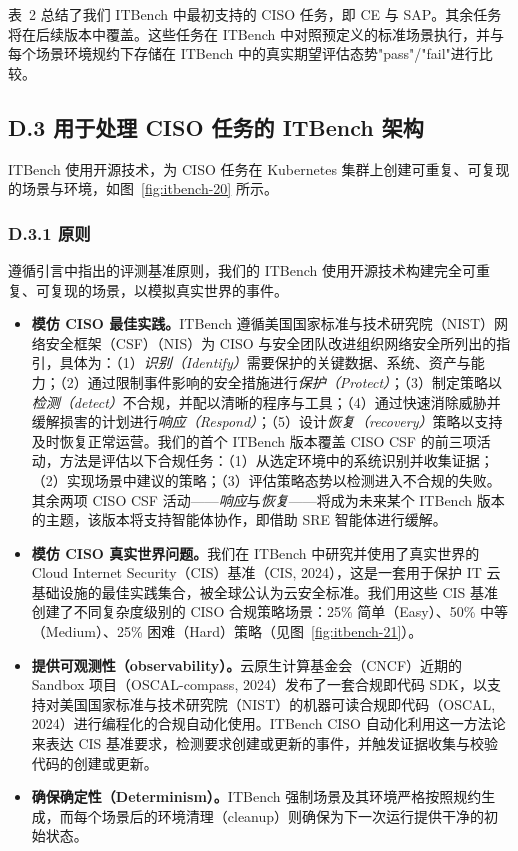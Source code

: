 \documentclass[10pt,UTF8,fontset=fandol]{ctexart}
\begin{document}
表~2 总结了我们 ITBench 中最初支持的 CISO 任务，即 CE 与 SAP。其余任务将在后续版本中覆盖。这些任务在 ITBench 中对照预定义的标准场景执行，并与每个场景环境规约下存储在 ITBench 中的真实期望评估态势"pass"/"fail"进行比较。

\subsection{D.3 用于处理 CISO 任务的 ITBench 架构}

ITBench 使用开源技术，为 CISO 任务在 Kubernetes 集群上创建可重复、可复现的场景与环境，如图~\ref{fig:itbench-20} 所示。

\subsubsection{D.3.1 原则}

遵循引言中指出的评测基准原则，我们的 ITBench 使用开源技术构建完全可重复、可复现的场景，以模拟真实世界的事件。

\begin{itemize}
\item \textbf{模仿 CISO 最佳实践。}ITBench 遵循美国国家标准与技术研究院（NIST）网络安全框架（CSF）（NIS）为 CISO 与安全团队改进组织网络安全所列出的指引，具体为：（1）\textit{识别（Identify）}需要保护的关键数据、系统、资产与能力；（2）通过限制事件影响的安全措施进行\textit{保护（Protect）}；（3）制定策略以\textit{检测（detect）}不合规，并配以清晰的程序与工具；（4）通过快速消除威胁并缓解损害的计划进行\textit{响应（Respond）}；（5）设计\textit{恢复（recovery）}策略以支持及时恢复正常运营。我们的首个 ITBench 版本覆盖 CISO CSF 的前三项活动，方法是评估以下合规任务：（1）从选定环境中的系统识别并收集证据；（2）实现场景中建议的策略；（3）评估策略态势以检测进入不合规的失败。其余两项 CISO CSF 活动——\textit{响应}与\textit{恢复}——将成为未来某个 ITBench 版本的主题，该版本将支持智能体协作，即借助 SRE 智能体进行缓解。
\item \textbf{模仿 CISO 真实世界问题。}我们在 ITBench 中研究并使用了真实世界的 Cloud Internet Security（CIS）基准（CIS, 2024），这是一套用于保护 IT 云基础设施的最佳实践集合，被全球公认为云安全标准。我们用这些 CIS 基准创建了不同复杂度级别的 CISO 合规策略场景：25\% 简单（Easy）、50\% 中等（Medium）、25\% 困难（Hard）策略（见图~\ref{fig:itbench-21}）。
\item \textbf{提供可观测性（observability）。}云原生计算基金会（CNCF）近期的 Sandbox 项目（OSCAL-compass, 2024）发布了一套合规即代码 SDK，以支持对美国国家标准与技术研究院（NIST）的机器可读合规即代码（OSCAL, 2024）进行编程化的合规自动化使用。ITBench CISO 自动化利用这一方法论来表达 CIS 基准要求，检测要求创建或更新的事件，并触发证据收集与校验代码的创建或更新。
\item \textbf{确保确定性（Determinism）。}ITBench 强制场景及其环境严格按照规约生成，而每个场景后的环境清理（cleanup）则确保为下一次运行提供干净的初始状态。
\end{itemize}
\end{document}
